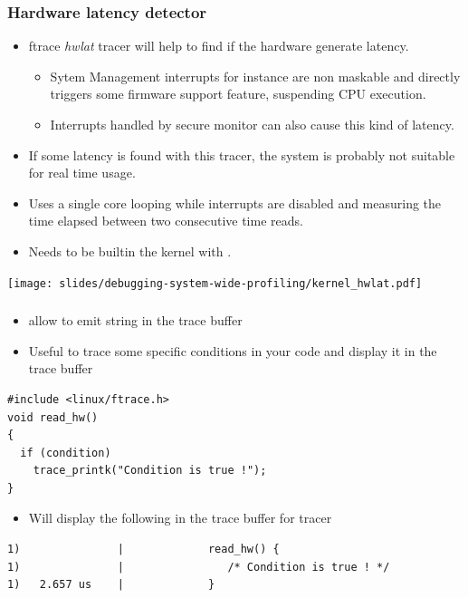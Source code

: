 \begin{frame}
  \frametitle{Hardware latency detector}
  \begin{itemize}
    \item ftrace {\em hwlat} tracer will help to find if the hardware generate
          latency.
    \begin{itemize}
      \item Sytem Management interrupts for instance are non maskable and
            directly triggers some firmware support feature, suspending CPU execution.
      \item Interrupts handled by secure monitor can also cause this kind of
            latency.
    \end{itemize}
    \item If some latency is found with this tracer, the system is probably
          not suitable for real time usage.
    \item Uses a single core looping while interrupts are disabled and measuring
          the time elapsed between two consecutive time reads.
    \item Needs to be builtin the kernel with .
  \end{itemize}

  \center\texttt{[image: slides/debugging-system-wide-profiling/kernel\_hwlat.pdf]}
\end{frame}

\begin{frame}[fragile]
  \frametitle{}
  \begin{itemize}
    \item {} allow to emit string in the trace buffer
    \item Useful to trace some specific conditions in your code and display it in the trace buffer 
  \end{itemize}
  \begin{block}{}
    \begin{verbatim}
#include <linux/ftrace.h>
void read_hw()
{
  if (condition)
    trace_printk("Condition is true !");
}
    \end{verbatim}
  \end{block}
  \begin{itemize}
    \item Will display the following in the trace buffer for  tracer
  \end{itemize}
  \begin{block}{}
    \begin{verbatim}
1)               |             read_hw() {
1)               |                /* Condition is true ! */
1)   2.657 us    |             }
    \end{verbatim}
  \end{block}
\end{frame}

